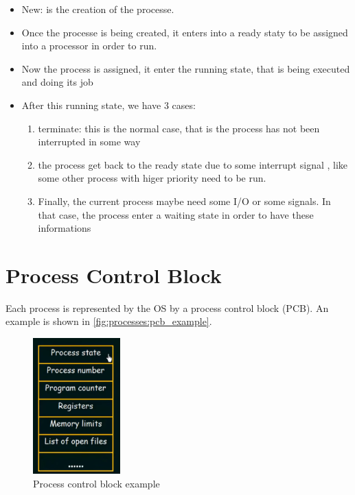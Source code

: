 \documentclass[12pt,a4paper]{book}
\begin{document}
\begin{itemize}

\item New: is the creation of the processe.

\item Once the processe is being created, it enters into a ready staty to be assigned into a processor in order to run.

\item Now the process is assigned, it enter the running state, that is being executed and doing its job

\item After this running state, we have 3 cases:

	\begin{enumerate}
	
	\item terminate: this is the normal case, that is the process has not been interrupted in some way	
	
	\item the process get back to the ready state due to some interrupt signal , like some other process with higer priority need to be run.
	
	\item Finally, the current process maybe need some I/O or some signals. In that case, the process enter a waiting state in order to have these informations	
	
	\end{enumerate}



\end{itemize}

\newpage
\section{Process Control Block}

Each process is represented by the OS by a process control block (PCB). An example is shown in \autoref{fig:processes:pcb_example}.


\begin{figure}[h]
\centering
\includegraphics[width = 0.3\textwidth, frame]{Figures/processes/pcb_example}
\caption{Process control block example}
\label{fig:processes:pcb_example}
\end{figure}
\end{document}
